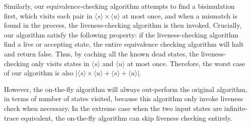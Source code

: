 \documentclass[conference]{IEEEtran}
\newcommand{\At}{\mathbf{At}}
\newcommand{\reject}{\mathinner{\mathrm{rej}}}
\newcommand{\accept}{\mathinner{\mathrm{acc}}}
\begin{document}
Similarly, our equivalence-checking algorithm attempts to find a bisimulation first, which visits each pair in \(⟨s⟩ × ⟨u⟩\) at most once, and when a mismatch is found in the process, the liveness-checking algorithm is then invoked.
Crucially, our algorithm satisfy the following property: if the liveness-checking algorithm find a live or accepting state, the entire equivalence checking algorithm will halt and return false.
Thus, by caching all the known dead states, the liveness-checking only visits states in \(⟨s⟩\) and \(⟨u⟩\) at most once.
Therefore, the worst case of our algorithm is also \(|⟨s⟩ × ⟨u⟩ + ⟨s⟩ + ⟨u⟩|\).

However, the on-the-fly algorithm will always out-perform the original algorithm, in terms of number of states visited, because this algorithm only invoke liveness check when necessary.
In the extreme case when the two input states are infinite-trace equivalent, the on-the-fly algorithm can skip liveness checking entirely.




\end{document}

